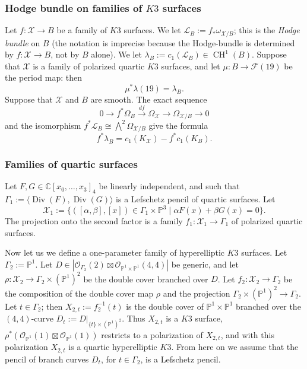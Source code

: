 \documentclass[11pt]{amsart}
\numberwithin{equation}{subsection}
\theoremstyle{plain}
\theoremstyle{remark}
\theoremstyle{definition}
\newcommand{\CC}{{\mathbb C}}
\newcommand{\cF}{{\mathscr F}}
\newcommand{\cL}{{\mathscr L}}
\newcommand{\cO}{{\mathscr O}}
\newcommand{\cX}{{\mathscr X}}
\newcommand{\la}{\langle}
\newcommand{\lra}{\longrightarrow}
\newcommand{\PP}{{\mathbb P}}
\newcommand{\ra}{\rangle}
\DeclareMathOperator{\CH}{CH}
\DeclareMathOperator{\Div}{Div}
\begin{document}
\subsubsection{Hodge bundle on families of $K3$ surfaces}
%
Let  $f\colon\cX\to B$ be a family of $K3$ surfaces. We let $\cL_B:=f_{*}\omega_{\cX/B}$; this is the \emph{Hodge bundle} on $B$ (the notation is imprecise because the Hodge-bundle is determined by  $f\colon\cX\to B$, not by $B$ alone). We let $\lambda_B:=c_1(\cL_B)\in\CH^1(B)$. Suppose that $\cX$ is a family of  polarized quartic $K3$ surfaces, and let $\mu\colon B\to \cF(19)$ be the period map: then
 \begin{equation}
%
 \mu^{*}\lambda(19)=\lambda_B.
%
\end{equation}
%
 Suppose that $\cX$ and $B$ are  smooth. The exact sequence
 $$0\lra f^{*}\Omega_B \overset{df}{\lra} \Omega_{\cX}\lra \Omega_{\cX/B}\lra 0$$
and the isomorphism $f^{*}\cL_B\cong \bigwedge^2\Omega_{\cX/B}$ give the formula
 \begin{equation}\label{eccolam}
%
f^{*}\lambda_B=c_1(K_{\cX})-f^{*}c_1(K_{B}).
%
\end{equation}
%
%
\subsubsection{Families of quartic surfaces}\label{subsubsec:intquartics}
%
Let  $F,G\in\CC[x_0,\ldots,x_3]_4$ be linearly independent, and such that $\Gamma_1:=\la \Div(F),\Div(G)\ra$ is a Lefschetz pencil  of quartic surfaces.  Let 
%
\begin{equation}
%
\cX_1:=\{([\alpha,\beta],[x])\in\Gamma_1\times\PP^3 \mid \alpha F(x)+\beta G(x)=0\}.
%
\end{equation}
%
The projection onto the second factor is a family $f_1\colon \cX_1\to \Gamma_1$ of polarized quartic surfaces. 

Now let us we define a one-parameter family of hyperelliptic $K3$ surfaces. Let $\Gamma_2:=\PP^1$. Let 
  $D\in| \cO_{\Gamma_2}(2)\boxtimes\cO_{\PP^1\times\PP^1}(4,4)|$ be generic, and let $\rho\colon\cX_2\to \Gamma_2\times(\PP^1)^2$ be the double cover branched over $D$.  Let $f_2\colon \cX_2\to\Gamma_2$ be the composition of the double cover map $\rho$ and the projection $\Gamma_2\times(\PP^1)^2\to\Gamma_2$. Let  $t\in\Gamma_2$; then $X_{2,t}:=f_2^{-1}(t)$ is the double cover of $\PP^1\times\PP^1$ branched over the $(4,4)$-curve $D_t:=D|_{\{t\}\times(\PP^1)^2}$. 
  Thus $X_{2,t}$ is  a $K3$ surface,   $\rho^{*}(\cO_{\PP^1}(1)\boxtimes\cO_{\PP^1}(1))$ restricts to a polarization of  $X_{2,t}$, and with this polarization $X_{2,t}$ is a quartic hyperelliptic $K3$. From here on we assume that the pencil of branch curves $D_t$, for $t\in\Gamma_2$, is a Lefschetz pencil.  
\end{document}
